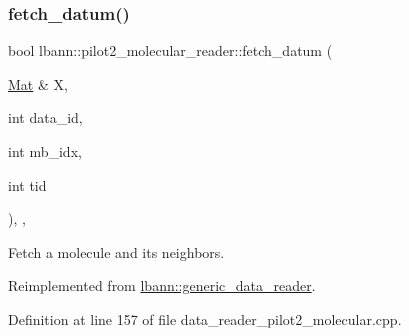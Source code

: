 \subsubsection{\texorpdfstring{fetch\+\_\+datum()}{fetch\_datum()}}
{\footnotesize\ttfamily bool lbann\+::pilot2\+\_\+molecular\+\_\+reader\+::fetch\+\_\+datum (\begin{DoxyParamCaption}\item[{\hyperlink{base_8hpp_a68f11fdc31b62516cb310831bbe54d73}{Mat} \&}]{X,  }\item[{int}]{data\+\_\+id,  }\item[{int}]{mb\+\_\+idx,  }\item[{int}]{tid }\end{DoxyParamCaption})\hspace{0.3cm}{\ttfamily [override]}, {\ttfamily [protected]}, {\ttfamily [virtual]}}



Fetch a molecule and its neighbors. 



Reimplemented from \hyperlink{classlbann_1_1generic__data__reader_a0a3cd87ed4a7057df185e0087f2d21c1}{lbann\+::generic\+\_\+data\+\_\+reader}.



Definition at line 157 of file data\+\_\+reader\+\_\+pilot2\+\_\+molecular.\+cpp.



